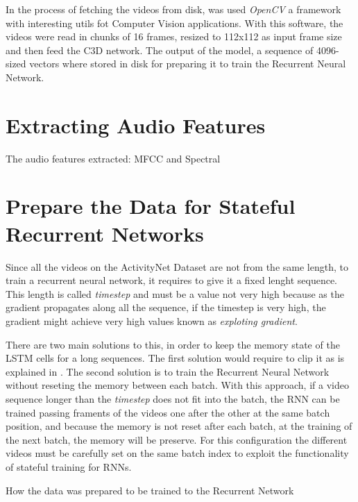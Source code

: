 In the process of fetching the videos from disk, was used \textit{OpenCV}\cite{opencv_library} a framework with interesting utils fot Computer Vision applications. With this software, the videos were read in chunks of 16 frames, resized to 112x112 as input frame size and then feed the C3D network. The output of the model, a sequence of 4096-sized vectors where stored in disk for preparing it to train the Recurrent Neural Network.

\section{Extracting Audio Features}

The audio features extracted: MFCC and Spectral


\section{Prepare the Data for Stateful Recurrent Networks}

Since all the videos on the ActivityNet Dataset are not from the same length, to train a recurrent neural network, it requires to give it a fixed lenght sequence. This length is called \textit{timestep} and must be a value not very high because as the gradient propagates along all the sequence, if the timestep is very high, the gradient might achieve very high values known as \textit{exploting gradient}.

There are two main solutions to this, in order to keep the memory state of the LSTM cells for a long sequences. The first solution would require to clip it as is explained in \cite{pascanu2012difficulty}. The second solution is to train the Recurrent Neural Network without reseting the memory between each batch. With this approach, if a video sequence longer than the \textit{timestep} does not fit into the batch, the RNN can be trained passing framents of the videos one after the other at the same batch position, and because the memory is not reset after each batch, at the training of the next batch, the memory will be preserve. For this configuration the different videos must be carefully set on the same batch index to exploit the  functionality of stateful training for RNNs.





How the data was prepared to be trained to the Recurrent Network

